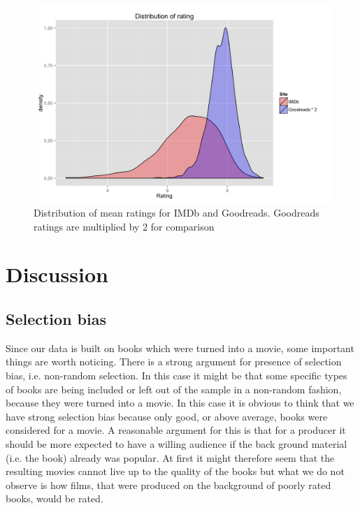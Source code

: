 \documentclass[12pt]{article}
\begin{document}
\begin{figure}[H]
\centering
\includegraphics[scale=0.1]{rating}
\caption{Distribution of mean ratings for IMDb and Goodreads. Goodreads ratings are multiplied by 2 for comparison }
\label{fig:my_label}
\end{figure}






\section{Discussion} %
\label{sec:discussion}


\subsection{Selection bias}

Since our data is built on books which were turned into a movie, some important things are worth noticing.
There is a strong argument for presence of selection bias, i.e. non-random selection. In this case it might be that some specific types of books are being included or left out of the sample in a non-random fashion, because they were turned into a movie.
In this case it is obvious to think that we have strong selection bias because only good, or above average, books were considered for a movie. A reasonable argument for this is that for a producer it should be more expected to have a willing audience if the back ground material (i.e. the book) already was popular.
At first it might therefore seem that the resulting movies cannot live up to the quality of the books but what we do not observe is how films, that were produced on the background of poorly rated books, would be rated. 
\end{document}
